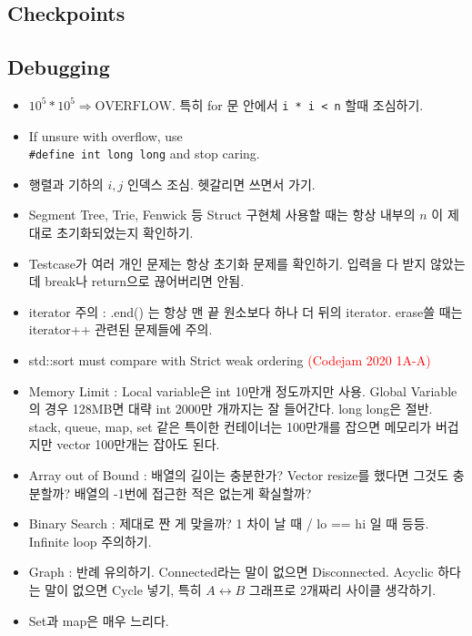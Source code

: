 \documentclass[9pt, a4paper, notitlepage]{extreport}
\begin{document}
	\begin{multicols*}{2}
	\chapter{Checkpoints}
	\section{Debugging}
	\begin{itemize}
	  \item $10^5 * 10^5 \Rightarrow \text{OVERFLOW}$. 특히 for 문 안에서 \texttt{i * i < n} 할때 조심하기.
	  \item If unsure with overflow, use \\
	  \texttt{\#define int long long} and stop caring.
	  \item 행렬과 기하의 $i, j$ 인덱스 조심. 헷갈리면 쓰면서 가기.
	  \item Segment Tree, Trie, Fenwick 등 Struct 구현체 사용할 때는 항상 내부의 $n$ 이 제대로 초기화되었는지 확인하기.
	  \item Testcase가 여러 개인 문제는 항상 초기화 문제를 확인하기. 입력을 다 받지 않았는데 break나 return으로 끊어버리면 안됨.
	  \item iterator 주의 : .end() 는 항상 맨 끝 원소보다 하나 더 뒤의 iterator. erase쓸 때는 iterator++ 관련된 문제들에 주의.
	  \item std::sort must compare with Strict weak ordering \textcolor{red}{(Codejam 2020 1A-A)}
	  \item Memory Limit : Local variable은 int 10만개 정도까지만 사용. Global Variable의 경우 128MB면 대략 int 2000만 개까지는 잘 들어간다. long long은 절반. stack, queue, map, set 같은 특이한 컨테이너는 100만개를 잡으면 메모리가 버겁지만 vector 100만개는 잡아도 된다.
	  \item Array out of Bound : 배열의 길이는 충분한가? Vector resize를 했다면 그것도 충분할까? 배열의 -1번에 접근한 적은 없는게 확실할까?
	  \item Binary Search : 제대로 짠 게 맞을까? 1 차이 날 때 / lo == hi 일 때 등등. Infinite loop 주의하기.
	  \item Graph : 반례 유의하기. Connected라는 말이 없으면 Disconnected. Acyclic 하다는 말이 없으면 Cycle 넣기, 특히 $A \leftrightarrow B$ 그래프로 2개짜리 사이클 생각하기.
	  \item Set과 map은 매우 느리다.
	\end{itemize}
	\vfill{\null}

\end{multicols*}
\end{document}
